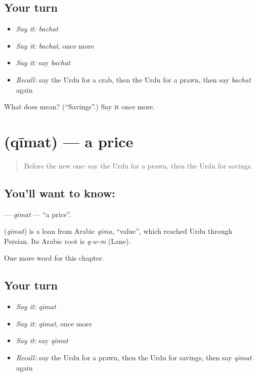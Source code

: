 \subsection*{Your turn}
\begin{itemize}
\raggedright
  \item \emph{Say it:} \emph{bachat}
  \item \emph{Say it:} \emph{bachat}, once more
  \item \emph{Say it:} say \emph{bachat}
  \item \emph{Recall:} say the Urdu for a crab, then the Urdu for a prawn, then say \emph{bachat} again
\end{itemize}

\begin{tcolorbox}[breakable,colback=teal!4,colframe=teal!35!black,title={Before you move on}]
What does  mean? (\textquotedblleft{}Savings\textquotedblright{}.) Say it once more.
\end{tcolorbox}
\section[\texorpdfstring{\ur{قیمت} (qīmat)}{قیمت (qīmat)}]{ (qīmat) — a price}

\label{lesson:UR-C236-qimat}



\begin{quote}
Before the new one: say the Urdu for a prawn, then the Urdu for savings.
\end{quote}

\subsection*{You'll want to know: }
\textbf{} — \emph{qīmat} — \textquotedblleft{}a price\textquotedblright{}.

\begin{cousinweb}
\textbf{} (\emph{qīmat}) is a loan from Arabic \emph{qīma}, \textquotedblleft{}value\textquotedblright{}, which reached Urdu through Persian. Its Arabic root is \emph{q-w-m} (Lane).
\end{cousinweb}

\begin{grammarlens}[title={What you've built}]
One more word for this chapter.
\end{grammarlens}

\subsection*{Your turn}
\begin{itemize}
\raggedright
  \item \emph{Say it:} \emph{qīmat}
  \item \emph{Say it:} \emph{qīmat}, once more
  \item \emph{Say it:} say \emph{qīmat}
  \item \emph{Recall:} say the Urdu for a prawn, then the Urdu for savings, then say \emph{qīmat} again
\end{itemize}

